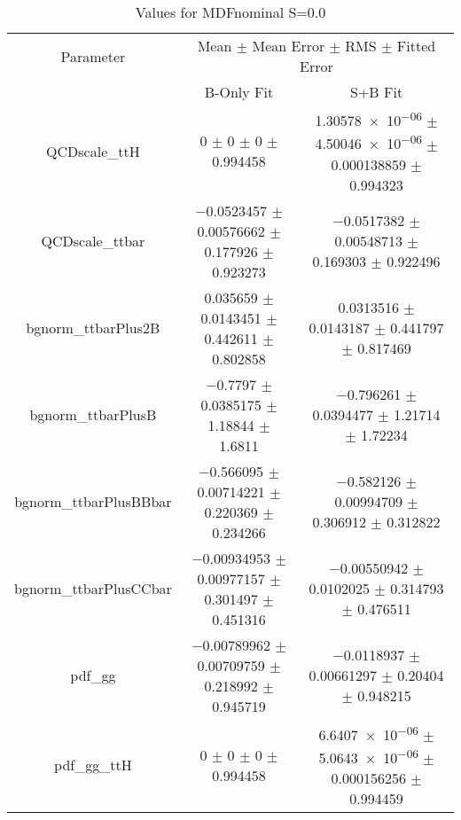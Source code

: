 \begin{table}
\centering
\caption{Values for MDFnominal S=0.0}
\begin{tabular}{ccc}
\toprule
Parameter & \multicolumn{2}{c}{Mean $\pm$ Mean Error $\pm$ RMS $\pm$ Fitted Error}\\
 & B-Only Fit & S+B Fit\\
\midrule
QCDscale\_ttH & \num{0} $\pm$ \num{0} $\pm$ \num{0} $\pm$ \num{0.994458} & \num{1.30578e-06} $\pm$ \num{4.50046e-06} $\pm$ \num{0.000138859} $\pm$ \num{0.994323}\\
QCDscale\_ttbar & \num{-0.0523457} $\pm$ \num{0.00576662} $\pm$ \num{0.177926} $\pm$ \num{0.923273} & \num{-0.0517382} $\pm$ \num{0.00548713} $\pm$ \num{0.169303} $\pm$ \num{0.922496}\\
bgnorm\_ttbarPlus2B & \num{0.035659} $\pm$ \num{0.0143451} $\pm$ \num{0.442611} $\pm$ \num{0.802858} & \num{0.0313516} $\pm$ \num{0.0143187} $\pm$ \num{0.441797} $\pm$ \num{0.817469}\\
bgnorm\_ttbarPlusB & \num{-0.7797} $\pm$ \num{0.0385175} $\pm$ \num{1.18844} $\pm$ \num{1.6811} & \num{-0.796261} $\pm$ \num{0.0394477} $\pm$ \num{1.21714} $\pm$ \num{1.72234}\\
bgnorm\_ttbarPlusBBbar & \num{-0.566095} $\pm$ \num{0.00714221} $\pm$ \num{0.220369} $\pm$ \num{0.234266} & \num{-0.582126} $\pm$ \num{0.00994709} $\pm$ \num{0.306912} $\pm$ \num{0.312822}\\
bgnorm\_ttbarPlusCCbar & \num{-0.00934953} $\pm$ \num{0.00977157} $\pm$ \num{0.301497} $\pm$ \num{0.451316} & \num{-0.00550942} $\pm$ \num{0.0102025} $\pm$ \num{0.314793} $\pm$ \num{0.476511}\\
pdf\_gg & \num{-0.00789962} $\pm$ \num{0.00709759} $\pm$ \num{0.218992} $\pm$ \num{0.945719} & \num{-0.0118937} $\pm$ \num{0.00661297} $\pm$ \num{0.20404} $\pm$ \num{0.948215}\\
pdf\_gg\_ttH & \num{0} $\pm$ \num{0} $\pm$ \num{0} $\pm$ \num{0.994458} & \num{6.6407e-06} $\pm$ \num{5.0643e-06} $\pm$ \num{0.000156256} $\pm$ \num{0.994459}\\
\bottomrule
\end{tabular}
\end{table}